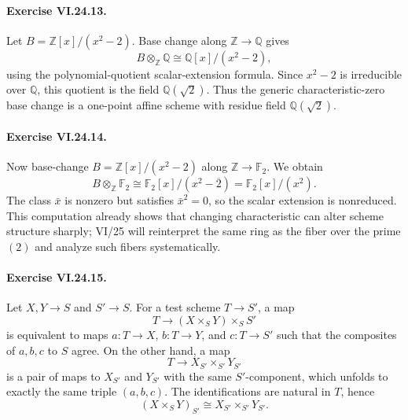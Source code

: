 \paragraph{Exercise VI.24.13.}
\begin{solution}
Let $B=\mathbb Z[x]/(x^2-2)$.  Base change along $\mathbb Z\to\mathbb Q$ gives
\[
B\otimes_{\mathbb Z}\mathbb Q
\cong \mathbb Q[x]/(x^2-2),
\]
using the polynomial-quotient scalar-extension formula.  Since $x^2-2$ is irreducible over
$\mathbb Q$, this quotient is the field $\mathbb Q(\sqrt2)$.  Thus the generic characteristic-zero
base change is a one-point affine scheme with residue field $\mathbb Q(\sqrt2)$.
\end{solution}

\paragraph{Exercise VI.24.14.}
\begin{solution}
Now base-change $B=\mathbb Z[x]/(x^2-2)$ along $\mathbb Z\to\mathbb F_2$.  We obtain
\[
B\otimes_{\mathbb Z}\mathbb F_2
\cong\mathbb F_2[x]/(x^2-\overline2)
=\mathbb F_2[x]/(x^2).
\]
The class $\bar x$ is nonzero but satisfies $\bar x^2=0$, so the scalar extension is nonreduced.
This computation already shows that changing characteristic can alter scheme structure sharply;
VI/25 will reinterpret the same ring as the fiber over the prime $(2)$ and analyze such fibers
systematically.
\end{solution}

\paragraph{Exercise VI.24.15.}
\begin{solution}
Let $X,Y\to S$ and $S'\to S$.  For a test scheme $T\to S'$, a map
\[
T\to (X\times_SY)\times_SS'
\]
is equivalent to maps $a:T\to X$, $b:T\to Y$, and $c:T\to S'$ such that the composites of
$a,b,c$ to $S$ agree.  On the other hand, a map
\[
T\to X_{S'}\times_{S'}Y_{S'}
\]
is a pair of maps to $X_{S'}$ and $Y_{S'}$ with the same $S'$-component, which unfolds to exactly
the same triple $(a,b,c)$.  The identifications are natural in $T$, hence
\[
(X\times_SY)_{S'}\cong X_{S'}\times_{S'}Y_{S'}.
\]
\end{solution}

